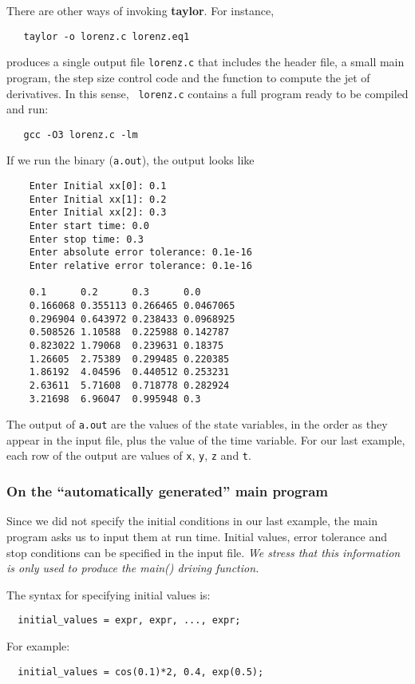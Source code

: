 \documentclass{article}
\begin{document}
There are other ways of invoking {\bf taylor}. For instance,
\begin{verbatim}
   taylor -o lorenz.c lorenz.eq1
\end{verbatim}
produces a single output file {\tt lorenz.c} that includes the header
file, a small main program, the step size control code and the
function to compute the jet of derivatives. In this sense, {\tt
lorenz.c} contains a full program ready to be compiled and run:
\begin{verbatim}
   gcc -O3 lorenz.c -lm
\end{verbatim}
If we run the binary ({\tt a.out}), the output looks like
\begin{verbatim}
    Enter Initial xx[0]: 0.1
    Enter Initial xx[1]: 0.2
    Enter Initial xx[2]: 0.3
    Enter start time: 0.0
    Enter stop time: 0.3
    Enter absolute error tolerance: 0.1e-16
    Enter relative error tolerance: 0.1e-16

    0.1      0.2      0.3      0.0
    0.166068 0.355113 0.266465 0.0467065
    0.296904 0.643972 0.238433 0.0968925
    0.508526 1.10588  0.225988 0.142787
    0.823022 1.79068  0.239631 0.18375
    1.26605  2.75389  0.299485 0.220385
    1.86192  4.04596  0.440512 0.253231
    2.63611  5.71608  0.718778 0.282924
    3.21698  6.96047  0.995948 0.3
\end{verbatim}
The output of \verb+a.out+ are the values
of the state variables, in the order as
they appear in the input file, plus the value
of the time variable. For our last example, 
each row of the output are values of {\tt x},
{\tt y}, {\tt z} and {\tt t}.


\subsubsection{On the ``automatically generated'' main program}
Since we did not specify the initial conditions in our last
example, the main program asks us to input them at run time.
Initial values, 
error tolerance and stop conditions can be
specified in the input file. {\em We stress that this information
is only used to produce the main() driving function.}

The syntax for specifying initial values is:
\begin{verbatim}
  initial_values = expr, expr, ..., expr;
\end{verbatim}
For example:
\begin{verbatim}
  initial_values = cos(0.1)*2, 0.4, exp(0.5);
\end{verbatim}
\end{document}
